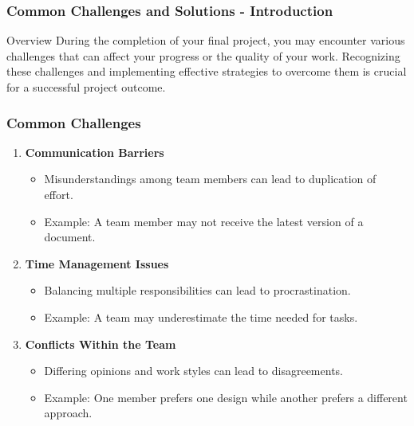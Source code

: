 \documentclass[aspectratio=169]{beamer}
\begin{document}
\begin{frame}[fragile]
    \frametitle{Common Challenges and Solutions - Introduction}
    \begin{block}{Overview}
    During the completion of your final project, you may encounter various challenges that can affect your progress or the quality of your work. Recognizing these challenges and implementing effective strategies to overcome them is crucial for a successful project outcome.
    \end{block}
\end{frame}

\begin{frame}[fragile]
    \frametitle{Common Challenges}
    \begin{enumerate}
        \item \textbf{Communication Barriers}
        \begin{itemize}
            \item Misunderstandings among team members can lead to duplication of effort.
            \item Example: A team member may not receive the latest version of a document.
        \end{itemize}

        \item \textbf{Time Management Issues}
        \begin{itemize}
            \item Balancing multiple responsibilities can lead to procrastination.
            \item Example: A team may underestimate the time needed for tasks.
        \end{itemize}

        \item \textbf{Conflicts Within the Team}
        \begin{itemize}
            \item Differing opinions and work styles can lead to disagreements.
            \item Example: One member prefers one design while another prefers a different approach.
        \end{itemize}
    \end{enumerate}
\end{frame}
\end{document}
